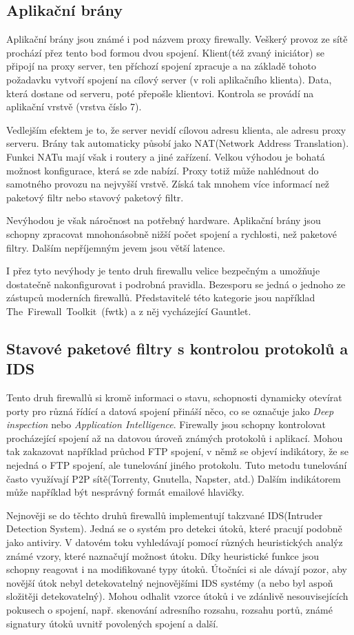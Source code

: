 \documentclass[11pt,a4paper]{article}
\begin{document}
\subsection{Aplikační brány}
Aplikační brány jsou známé i pod názvem proxy firewally. Veškerý provoz ze sítě prochází přez tento bod formou dvou spojení. Klient(též zvaný iniciátor) se připojí na proxy server, ten příchozí spojení zpracuje a na základě tohoto požadavku vytvoří spojení na cílový server (v roli aplikačního klienta). Data, která dostane od serveru, poté přepošle klientovi. Kontrola se provádí na aplikační vrstvě (vrstva číslo 7).

Vedlejším efektem je to, že server nevidí cílovou adresu klienta, ale adresu proxy serveru. Brány tak automaticky působí jako NAT(Network Address Translation). Funkci NATu mají však i routery a jiné zařízení. Velkou výhodou je bohatá možnost konfigurace, která se zde nabízí. Proxy totiž může nahlédnout do samotného provozu na nejvyšší vrstvě. Získá tak mnohem více informací než paketový filtr nebo stavový paketový filtr.

Nevýhodou je však náročnost na potřebný hardware. Aplikační brány jsou schopny zpracovat mnohonásobně nižší počet spojení a rychlosti, než paketové filtry. Dalším nepříjemným jevem jsou větší latence.  

I přez tyto nevýhody je tento druh firewallu velice bezpečným a umožňuje dostatečně nakonfigurovat i podrobná pravidla. Bezesporu se jedná o jednoho ze zástupců moderních firewallů. Představitelé této kategorie jsou například The~Firewall~Toolkit~(fwtk) a z něj vycházející Gauntlet.

\subsection{Stavové paketové filtry s kontrolou protokolů a IDS}
Tento druh firewallů si kromě informaci o stavu, schopnosti dynamicky otevírat porty pro různá řídící a datová spojení přináší něco, co se označuje jako \textit{Deep inspection} nebo \textit{Application Intelligence}. Firewally jsou schopny kontrolovat procházející spojení až na datovou úroveň známých protokolů i aplikací. Mohou tak zakazovat například průchod FTP spojení, v němž se objeví indikátory, že se nejedná o FTP spojení, ale tunelování jiného protokolu. Tuto metodu tunelování často využívají P2P sítě(Torrenty, Gnutella, Napster, atd.) Dalším indikátorem může například být nesprávný formát emailové hlavičky. 

Nejnověji se do  těchto druhů firewallů implementují takzvané IDS(Intruder Detection System). Jedná se o systém pro detekci útoků, které pracují podobně jako antiviry. V datovém toku vyhledávají pomocí různých heuristických analýz známé vzory, které naznačují možnost útoku. Díky heuristické funkce jsou schopny reagovat i na modifikované typy útoků. Útočníci si ale dávají pozor, aby novější útok nebyl detekovatelný nejnovějšími IDS systémy (a nebo byl aspoň složitěji detekovatelný). Mohou odhalit vzorce útoků i ve zdánlivě nesouvisejících pokusech o spojení, např. skenování adresního rozsahu, rozsahu portů, známé signatury útoků uvnitř povolených spojení a další.
\end{document}
